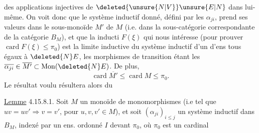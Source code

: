 
des applications injectives de $\deleted{\unsure{N|V}}\unsure{E|N}$ dans lui-même. On voit donc que le système inductif donné, défini par les $\alpha_{ji}$, prend ses valeurs dans le sous-monoïde $M'$ de $M$ (i.e. dans la sous-catégorie
correspondante de  la catégorie $B_M$), et que la   inducti $F(\xi)$ qui nous intéresse (pour prouver $\operatorname{card} F(\xi)\leq\pi_0$)
est   la limite inductive du système inductif  d'un   d'ens tous égaux à $\deleted{N}E$, les morphismes de transition étant les $\overline{\alpha_{ji}}\in\overline{M'}\subset\operatorname{Mon}(\deleted{N}E)$. De plus,
  
\[
\operatorname{card}\overline{M'}\leq\operatorname{card}M\leq\pi_0.
\]
 Le résultat  voulu résultera alors du

\uline{Lemme} 4.15.8.1. Soit $M$ un monoïde de monomorphismes (i.e tel que $uv=uv'\Longrightarrow v=v'$, pour $u,v,v'\in M$), et soit
$(\alpha_{ji})_{i\leq j}$ un système inductif dans $B_M$, indexé par un ens. ordonné $I$  devant $\pi_0$, où $\pi_0$ est un cardinal
